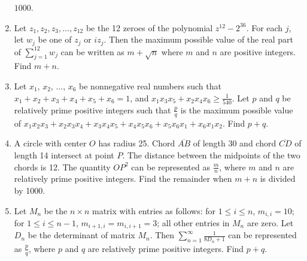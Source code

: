 \documentclass{article}
\begin{document}
\begin{enumerate}[label=\arabic*., itemsep=0.5em]
$1000$.\par \vspace{0.5em}\item Let $z_1,z_2,z_3,\dots,z_{12}$ be the 12 zeroes of the polynomial $z^{12}-2^{36}$. For each $j$, let $w_j$ be one of $z_j$ or $i z_j$. Then the maximum possible value of the real part of $\sum_{j=1}^{12} w_j$ can be written as $m+\sqrt{n}$ where $m$ and $n$ are positive integers. Find $m+n$.\par \vspace{0.5em}\item Let $x_1$, $x_2$, $\dots$, $x_6$ be nonnegative real numbers such that $x_1 + x_2 + x_3 + x_4 + x_5 + x_6 = 1$, and $x_1x_3x_5 + x_2x_4x_6 \ge {\frac{1}{540}}$. Let $p$ and $q$ be relatively prime positive integers such that $\frac{p}{q}$ is the maximum possible value of $x_1x_2x_3 + x_2x_3x_4 + x_3x_4x_5 + x_4x_5x_6 + x_5x_6x_1 + x_6x_1x_2$. Find $p + q$.\par \vspace{0.5em}\item A circle with center $O$ has radius 25. Chord $\overline{AB}$ of length 30 and chord $\overline{CD}$ of length 14 intersect at point $P$. The distance between the midpoints of the two chords is 12. The quantity $OP^2$ can be represented as $\frac{m}{n}$, where $m$ and $n$ are relatively prime positive integers. Find the remainder when $m + n$ is divided by 1000.\par \vspace{0.5em}\item Let $M_n$ be the $n \times n$ matrix with entries as follows: for $1 \le i \le n$, $m_{i,i} = 10$; for $1 \le i \le n - 1$, $m_{i+1,i} = m_{i,i+1} = 3$; all other entries in $M_n$ are zero. Let $D_n$ be the determinant of matrix $M_n$. Then $\sum_{n=1}^{\infty} \frac{1}{8D_n+1}$ can be represented as $\frac{p}{q}$, where $p$ and $q$ are relatively prime positive integers. Find $p + q$. 


\end{enumerate}
\end{document}
